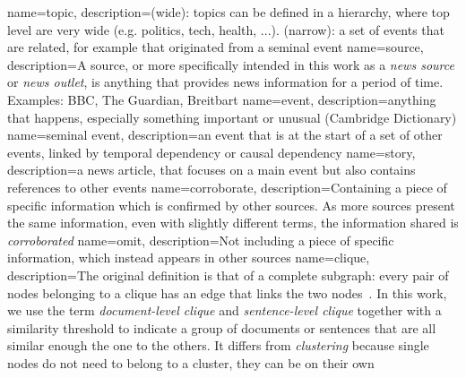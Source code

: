 {
    name=topic,
    description={(wide): topics can be defined in a hierarchy, where top level are very wide (e.g. politics, tech, health, ...).
            (narrow): a set of events that are related, for example that originated from a seminal event}
}
{
    name=source,
    description={A source, or more specifically intended in this work as a \emph{news source} or \emph{news outlet}, is anything that provides news information for a period of time. Examples: BBC, The Guardian, Breitbart}
}
{
    name=event,
    description={anything that happens, especially something important or unusual (Cambridge Dictionary)}
}
{
    name=seminal event,
    description={an event that is at the start of a set of other events, linked by temporal dependency or causal dependency}
}
{
    name=story,
    description={a news article, that focuses on a main event but also contains references to other events}
}
{
    name=corroborate,
    description={Containing a piece of specific information which is confirmed by other sources. As more sources present the same information, even with slightly different terms, the information shared is \emph{corroborated}}
}
{
    name=omit,
    description={Not including a piece of specific information, which instead appears in other sources}
}
{
    name=clique,
    description={The original definition is that of a complete subgraph: every pair of nodes belonging to a clique has an edge that links the two nodes~\citep{luce1949method}. In this work, we use the term \emph{document-level clique} and \emph{sentence-level clique} together with a similarity threshold to indicate a group of documents or sentences that are all similar enough the one to the others. It differs from \emph{clustering} because single nodes do not need to belong to a cluster, they can be on their own}
}
